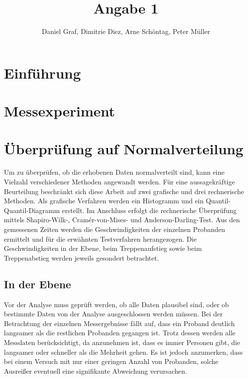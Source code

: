 
 
\title{Angabe 1}
\providecommand{\subtitle}[1]{}
\subtitle{Untertitel}
\author{Daniel Graf, Dimitrie Diez, Arne Schöntag, Peter Müller}
\date{}


\maketitle


\tableofcontents

\section{Einführung}


\section{Messexperiment}
\section{Überprüfung auf Normalverteilung}
Um zu überprüfen, ob die erhobenen Daten normalverteilt sind, kann eine Vielzahl verschiedener Methoden angewandt werden. Für eine aussagekräftige Beurteilung beschränkt sich diese Arbeit auf zwei grafische und drei rechnerische Methoden. Als grafische Verfahren werden ein Histogramm und ein Quantil-Quantil-Diagramm erstellt. Im Anschluss erfolgt die rechnerische Überprüfung mittels Shapiro-Wilk-, Cramér-von-Mises- und Anderson-Darling-Test. Aus den gemessenen Zeiten werden die Geschwindigkeiten der einzelnen Probanden ermittelt und für die erwähnten Testverfahren herangezogen. Die Geschwindigkeiten in der Ebene, beim Treppenaufstieg sowie beim Treppenabstieg werden jeweils gesondert betrachtet.

\subsection{In der Ebene}
Vor der Analyse muss geprüft werden, ob alle Daten plausibel sind, oder ob bestimmte Daten von der Analyse ausgeschlossen werden müssen. Bei der Betrachtung der einzelnen Messergebnisse fällt auf, dass ein Proband deutlich langsamer als die restlichen Probanden gegangen ist. Trotz dessen werden alle Messdaten berücksichtigt, da anzunehmen ist, dass es immer Personen gibt, die langsamer oder schneller als die Mehrheit gehen. Es ist jedoch anzumerken, dass bei einem Versuch mit nur einer geringen Anzahl von Probanden, solche Ausreißer eventuell eine signifikante Abweichung verursachen.

